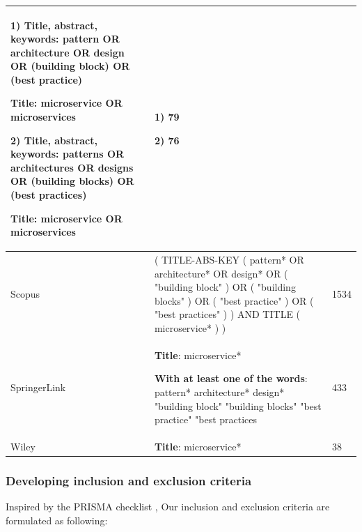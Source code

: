 \documentclass{bmcart}
\begin{document}
\begin{table}[h]
\begin{tabular}{|p{3cm}|p{7cm}|p{1.5cm}|}
        1) \textbf{Title, abstract, keywords}: pattern OR architecture OR design OR (building block) OR (best practice)

           \textbf{Title}: microservice OR microservices

        2) \textbf{Title, abstract, keywords}: patterns OR architectures OR designs OR (building blocks) OR (best practices)

            \textbf{Title}: microservice OR microservices
        & 
        1) 79

        2) 76
        \\ 

        \hline

        Scopus & ( TITLE-ABS-KEY ( pattern*  OR  architecture*  OR  design*  OR  ( "building block" )  OR  ( "building blocks" )  OR  ( "best practice" )  OR  ( "best practices" ) )  AND  TITLE ( microservice* ) ) & 1534 \\ 
        \hline

        SpringerLink & \textbf{Title}: microservice*


        \textbf{With at least one of the words}: pattern* architecture* design* "building block" "building blocks" "best practice" "best practices
         & 433 \\ 
        \hline

        Wiley & \textbf{Title}: microservice* & 38 \\ 

        \hline
    \end{tabular}
    
    \label{searchTerms}
\end{table}


\subsubsection{Developing inclusion and exclusion criteria} \label{incexc}

Inspired by the PRISMA checklist \cite{tricco2018prisma}, Our inclusion and exclusion criteria are formulated as following:
\end{document}
